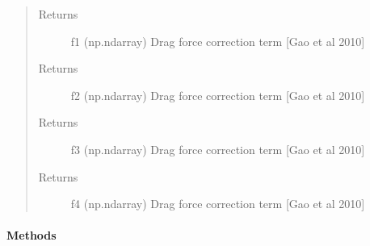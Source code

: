 \documentclass[letterpaper,10pt,english]{sphinxmanual}
\begin{document}
\begin{fulllineitems}
\begin{quote}
\begin{description}
\end{description}\end{quote}
\begin{quote}\begin{description}
\item[{Returns}] \leavevmode
f1 (np.ndarray) Drag force correction term {[}Gao et al 2010{]}

\item[{Returns}] \leavevmode
f2 (np.ndarray) Drag force correction term {[}Gao et al 2010{]}

\item[{Returns}] \leavevmode
f3 (np.ndarray) Drag force correction term {[}Gao et al 2010{]}

\item[{Returns}] \leavevmode
f4 (np.ndarray) Drag force correction term {[}Gao et al 2010{]}

\end{description}\end{quote}
\paragraph{Methods}

\end{fulllineitems}

\end{document}
